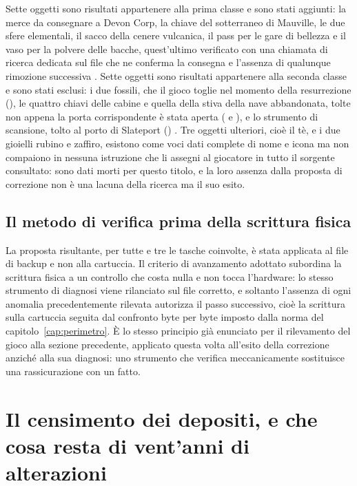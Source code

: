 Sette oggetti sono risultati appartenere alla prima classe e sono stati aggiunti: la merce da consegnare a Devon Corp, la chiave del sotterraneo di Mauville, le due sfere elementali, il sacco della cenere vulcanica, il pass per le gare di bellezza e il vaso per la polvere delle bacche, quest'ultimo verificato con una chiamata di ricerca dedicata sul file  che ne conferma la consegna e l'assenza di qualunque rimozione successiva \cite{pokeemerald}. Sette oggetti sono risultati appartenere alla seconda classe e sono stati esclusi: i due fossili, che il gioco toglie nel momento della resurrezione (), le quattro chiavi delle cabine e quella della stiva della nave abbandonata, tolte non appena la porta corrispondente è stata aperta ( e ), e lo strumento di scansione, tolto al porto di Slateport () \cite{pokeemerald}. Tre oggetti ulteriori, cioè il tè, e i due gioielli rubino e zaffiro, esistono come voci dati complete di nome e icona ma non compaiono in nessuna istruzione che li assegni al giocatore in tutto il sorgente consultato: sono dati morti per questo titolo, e la loro assenza dalla proposta di correzione non è una lacuna della ricerca ma il suo esito.

\subsection{Il metodo di verifica prima della scrittura fisica}

La proposta risultante, per tutte e tre le tasche coinvolte, è stata applicata al file di backup e non alla cartuccia. Il criterio di avanzamento adottato subordina la scrittura fisica a un controllo che costa nulla e non tocca l'hardware: lo stesso strumento di diagnosi viene rilanciato sul file corretto, e soltanto l'assenza di ogni anomalia precedentemente rilevata autorizza il passo successivo, cioè la scrittura sulla cartuccia seguita dal confronto byte per byte imposto dalla norma del capitolo~\ref{cap:perimetro}. È lo stesso principio già enunciato per il rilevamento del gioco alla sezione precedente, applicato questa volta all'esito della correzione anziché alla sua diagnosi: uno strumento che verifica meccanicamente sostituisce una rassicurazione con un fatto.

\section{Il censimento dei depositi, e che cosa resta di vent'anni di alterazioni}

